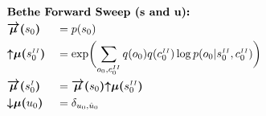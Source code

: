 \documentclass[fleqn]{article}
\begin{document}
\noindent
\setlength{\jot}{0.3em}
\begin{alignat}{2}
     & \rlap{\text{\bfseries Bethe Forward Sweep (s and u):}} \nonumber                                                                                                                                                                                                                                                                                                                                                                                                                                                                     \\
     & \bm{\overrightarrow{\mu}(}s_0\bm{)}                                                                                                                                                                                                                                                                                                                &  & = p(s_0)                                                                                                                                                                     \\
     & \bm{{\uparrow}{\mu}(}s^{\scriptscriptstyle II}_0\bm{)}                                                                                                                                                                                                                                                                                             &  & = \exp \biggl( \sum_{o_0,c^{\scriptscriptstyle II}_0} q(o_0)q(c^{\scriptscriptstyle II}_0) \log p(o_0|s^{\scriptscriptstyle II}_0,c^{\scriptscriptstyle II}_0) \biggr)       \\
     & \bm{\overrightarrow{\mu}(}s^{\scriptscriptstyle I}_0\bm{)}                                                                                                                                                                                                                                                                                         &  & = \bm{\overrightarrow{\mu}(}s_0\bm{)} \bm{{\uparrow}{\mu}(}s^{\scriptscriptstyle II}_0\bm{)}                                                                                 \\
     & \bm{{\downarrow}{\mu}(}u_0\bm{)}                                                                                                                                                                                                                                                                                                                   &  & = \delta_{u_0,\hat{u}_0}                                                                                                                                                     \\

\end{alignat}
\end{document}
